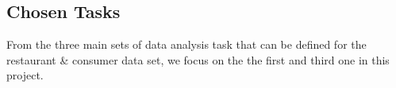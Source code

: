 

\subsection{Chosen Tasks}
From the three main sets of data analysis task that can be defined for the restaurant \& consumer data set, we focus on the the first and third one in this project. 

